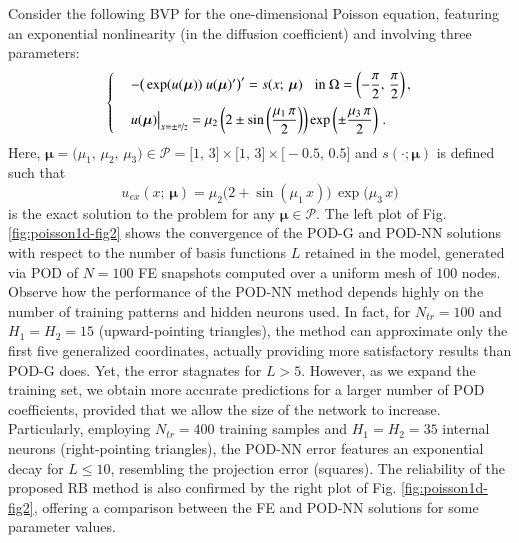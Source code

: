 \documentclass[longtitle]{elsarticle}
\numberwithin{equation}{section}
\theoremstyle{theorem}
\theoremstyle{definition}
\theoremstyle{remark}
\theoremstyle{proposition}
\numberwithin{figure}{section}
\newcommand{\bg}[1]{\boldsymbol{#1}}
\begin{document}
		Consider the following BVP for the one-dimensional Poisson equation, featuring an exponential nonlinearity (in the diffusion coefficient) and involving three parameters:
		\begin{equation}
			\label{eq:poisson1d}
			\begin{cases}
				& - \big( \exp(u(\bg{\mu})) ~ u(\bg{\mu})' \big)' = s(x; \, \bg{\mu}) \hspace*{0.3cm} \text{in $\Omega = \left( -\dfrac{\pi}{2}, \, \dfrac{\pi}{2} \right)$} \, , \\[0.3cm]
				& u(\bg{\mu}) \big|_{x = \pm \nicefrac{\pi}{2}} = \mu_2 \left( 2 \pm \sin\left( \dfrac{\mu_1 \, \pi}{2} \right) \right) \exp \left( \pm \dfrac{\mu_3 \, \pi}{2} \right) \, .
			\end{cases}
		\end{equation}
		Here, $\bg{\mu} = \big(\mu_1, \, \mu_2, \, \mu_3 \big) \in \mathcal{P} = \big[ 1, \, 3 \big] \times \big[ 1, \, 3 \big] \times \big[ -0.5, \, 0.5 \big]$ and $s(\cdot; \bg{\mu})$ is defined such that \[ u_{ex}(x; \, \bg{\mu}) = \mu_2 \big( 2 + \sin(\mu_1 \, x) \big) \, \exp \big( \mu_3 \, x \big) \] is the exact solution to the problem for any $\bg{\mu} \in \mathcal{P}$. The left plot of Fig. \ref{fig:poisson1d-fig2} shows the convergence of the POD-G and POD-NN solutions with respect to the number of basis functions $L$ retained in the model, generated via POD of $N = 100$ FE snapshots computed over a uniform mesh of $100$ nodes. Observe how the performance of the POD-NN method depends highly on the number of training patterns and hidden neurons used. In fact, for $N_{tr} = 100$ and $H_1 = H_2 = 15$ (upward-pointing triangles), the method can approximate only the first five generalized coordinates, actually providing more satisfactory results than POD-G does. Yet, the error stagnates for $L > 5$. However, as we expand the training set, we obtain more accurate predictions for a larger number of POD coefficients, provided that we allow the size of the network to increase. Particularly, employing $N_{tr} = 400$ training samples and $H_1 = H_2 = 35$ internal neurons (right-pointing triangles), the POD-NN error features an exponential decay for $L \leq 10$, resembling the projection error (squares). The reliability of the proposed RB method is also confirmed by the right plot of Fig. \ref{fig:poisson1d-fig2}, offering a comparison between the FE and POD-NN solutions for some parameter values.
				
\end{document}
